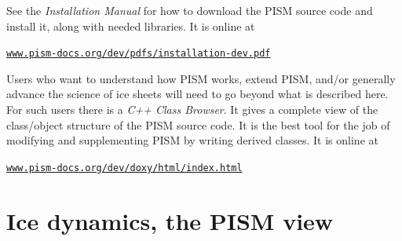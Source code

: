 \documentclass[11pt,final]{amsart}
\renewcommand{\t}[1]{\texttt{#1}}
\begin{document}
See the \emph{Installation Manual} for how to download the PISM source code and install it, along with needed libraries.  It is online at
   \begin{center}
     \href{http://www.pism-docs.org/dev/pdfs/installation-dev.pdf}{\t{www.pism-docs.org/dev/pdfs/installation-dev.pdf}}
   \end{center}

Users who want to understand how PISM works, extend PISM, and/or generally advance the science of ice sheets will need to go beyond what is described here.  For such users there is a \emph{C++ Class Browser}.  It gives a complete view of the class/object structure of the PISM source code.  It is the best tool for the job of modifying and supplementing PISM by writing derived classes.  It is online at
   \begin{center}
     \href{http://www.pism-docs.org/dev/doxy/html/index.html}{\t{www.pism-docs.org/dev/doxy/html/index.html}}
   \end{center}
  

\vspace{1.0in}
\large
\begin{center}
\normalsize
\end{center}
\normalsize


\clearpage\newpage



\clearpage
\newpage
\section{Ice dynamics, the PISM view}\label{sect:dynamics}
\end{document}
